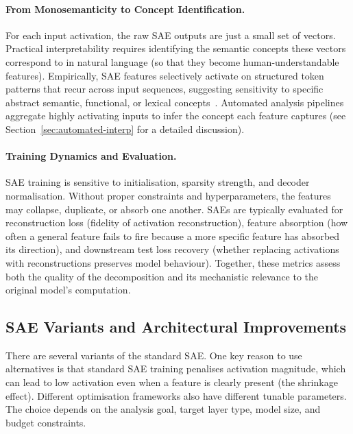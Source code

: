 \paragraph{From Monosemanticity to Concept Identification.}
For each input activation, the raw SAE outputs are just a small set of vectors. Practical interpretability requires identifying the semantic concepts these vectors correspond to in natural language (so that they become human-understandable features). Empirically, SAE features selectively activate on structured token patterns that recur across input sequences, suggesting sensitivity to specific abstract semantic, functional, or lexical concepts~. Automated analysis pipelines~ aggregate highly activating inputs to infer the concept each feature captures (see Section~\ref{sec:automated-interp} for a detailed discussion).

\paragraph{Training Dynamics and Evaluation.}
SAE training is sensitive to initialisation, sparsity strength, and decoder normalisation. Without proper constraints and hyperparameters, the features may collapse, duplicate, or absorb one another. SAEs are typically evaluated for reconstruction loss (fidelity of activation reconstruction), feature absorption (how often a general feature fails to fire because a more specific feature has absorbed its direction), and downstream test loss recovery (whether replacing activations with reconstructions preserves model behaviour). Together, these metrics assess both the quality of the decomposition and its mechanistic relevance to the original model's computation.

\subsection{SAE Variants and Architectural Improvements}
\label{subsec:sae-variants}

There are several variants of the standard SAE. One key reason to use alternatives is that standard SAE training penalises activation magnitude, which can lead to low activation even when a feature is clearly present (the shrinkage effect). Different optimisation frameworks also have different tunable parameters. The choice depends on the analysis goal, target layer type, model size, and budget constraints. 


